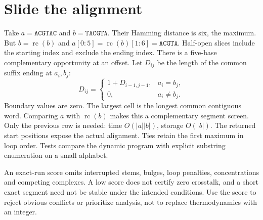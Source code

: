 \section{Slide the alignment}
Take $a=\texttt{ACGTAC}$ and $b=\texttt{TACGTA}$. Their Hamming distance
is six, the maximum. But $b=\operatorname{rc}(b)$ and
$a[0{:}5]=\operatorname{rc}(b)[1{:}6]=\texttt{ACGTA}$.
Half-open slices include the starting index and exclude the ending index.
There is a five-base complementary opportunity at an offset.
Let $D_{ij}$ be the length of the common suffix ending at $a_i,b_j$:
\begin{equation}
 D_{ij}=\begin{cases}1+D_{i-1,j-1},&a_i=b_j,\\0,&a_i\ne b_j.\end{cases}
\end{equation}
Boundary values are zero. The largest cell is the longest common contiguous
word. Comparing $a$ with $\operatorname{rc}(b)$ makes this a complementary
segment screen.
Only the previous row is needed: time $O(|a||b|)$, storage $O(|b|)$.
The returned start positions expose the actual alignment. Ties retain
the first maximum in loop order. Tests compare the dynamic program with
explicit substring enumeration on a small alphabet.

An exact-run score omits interrupted stems, bulges, loop penalties,
concentrations and competing complexes. A low score does not certify zero
crosstalk, and a short exact segment need not be stable under the intended
conditions. Use the score to reject obvious conflicts or prioritize analysis,
not to replace thermodynamics with an integer.

